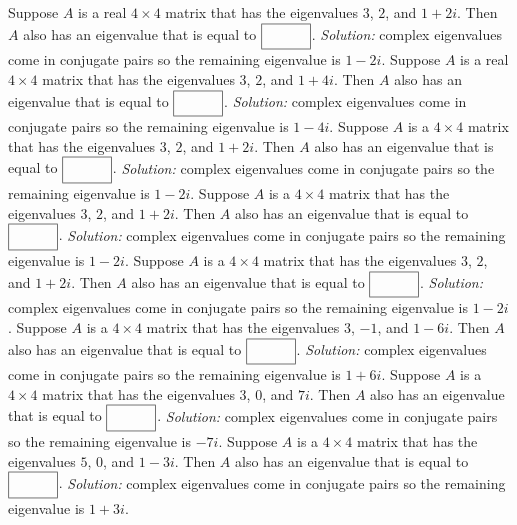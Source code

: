 \begin{parts}
{     } \fi    
    \fi 
    \ifnum {}
        Suppose $A$ is a real $4\times 4$ matrix that has the eigenvalues $3$, $2$, and $1+2i$. Then $A$ also has an eigenvalue that is equal to $\framebox{\strut\hspace{1cm}}$. 
        \ifnum {} {\color{DarkBlue} \textit{Solution:} complex eigenvalues come in conjugate pairs so the remaining eigenvalue is $1-2i$.  } \fi    
    \fi 
    \ifnum {}
        Suppose $A$ is a real $4\times 4$ matrix that has the eigenvalues $3$, $2$, and $1+4i$. Then $A$ also has an eigenvalue that is equal to $\framebox{\strut\hspace{1cm}}$. 
        \ifnum {} {\color{DarkBlue} \textit{Solution:} complex eigenvalues come in conjugate pairs so the remaining eigenvalue is $1-4i$.  } \fi   
    \fi 
    \ifnum {}
        Suppose $A$ is a $4\times 4$ matrix that has the eigenvalues $3$, $2$, and $1+2i$. Then $A$ also has an eigenvalue that is equal to $\framebox{\strut\hspace{1cm}}$. 
        \ifnum {} {\color{DarkBlue} \textit{Solution:} complex eigenvalues come in conjugate pairs so the remaining eigenvalue is $1-2i$.  } \fi      
    \fi 
    \ifnum {}
        Suppose $A$ is a $4\times 4$ matrix that has the eigenvalues $3$, $2$, and $1+2i$. Then $A$ also has an eigenvalue that is equal to $\framebox{\strut\hspace{1cm}}$. 
        \ifnum {} {\color{DarkBlue} \textit{Solution:} complex eigenvalues come in conjugate pairs so the remaining eigenvalue is $1-2i$.  } \fi  
    \fi 
    \ifnum {}
        Suppose $A$ is a $4\times 4$ matrix that has the eigenvalues $3$, $2$, and $1+2i$. Then $A$ also has an eigenvalue that is equal to $\framebox{\strut\hspace{1cm}}$. 
        \ifnum {} {\color{DarkBlue} \textit{Solution:} complex eigenvalues come in conjugate pairs so the remaining eigenvalue is $1-2i$.  } \fi  
    \fi 
    \ifnum {}
       Suppose $A$ is a $4\times 4$ matrix that has the eigenvalues $3$, $-1$, and $1-6i$. Then $A$ also has an eigenvalue that is equal to $\framebox{\strut\hspace{1cm}}$. 
        \ifnum {} {\color{DarkBlue} \textit{Solution:} complex eigenvalues come in conjugate pairs so the remaining eigenvalue is $1+6i$.  }
        \fi
    \fi    
    \ifnum {}
        Suppose $A$ is a $4\times 4$ matrix that has the eigenvalues $3$, $0$, and $7i$. Then $A$ also has an eigenvalue that is equal to $\framebox{\strut\hspace{1cm}}$. 
        \ifnum {} {\color{DarkBlue} \textit{Solution:} complex eigenvalues come in conjugate pairs so the remaining eigenvalue is $-7i$.  } \fi
    \fi    
    \ifnum {}
        Suppose $A$ is a $4\times 4$ matrix that has the eigenvalues $5$, $0$, and $1-3i$. Then $A$ also has an eigenvalue that is equal to $\framebox{\strut\hspace{1cm}}$. 
        \ifnum {} {\color{DarkBlue} \textit{Solution:} complex eigenvalues come in conjugate pairs so the remaining eigenvalue is $1+3i$.  } \fi
    \fi      



\end{parts}
